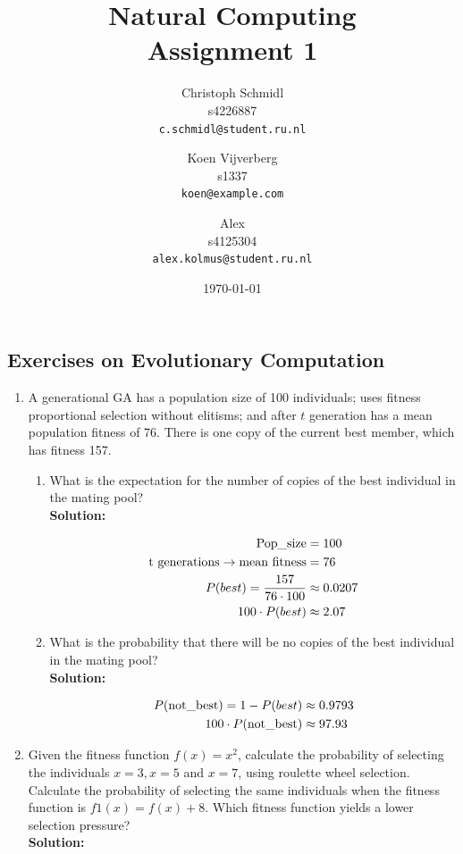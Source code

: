 \documentclass[a4paper]{article}
\title{Natural Computing\\Assignment 1}
\author{
  Christoph Schmidl\\ s4226887\\      \texttt{c.schmidl@student.ru.nl}
  \and
  Koen Vijverberg\\ s1337\\     \texttt{koen@example.com}
  \and
  Alex\\	s4125304\\	\texttt{alex.kolmus@student.ru.nl}
}
\date{\today}
\begin{document}
\maketitle


\subsection*{Exercises on Evolutionary Computation}

\begin{enumerate}

	\item A generational GA has a population size of 100 individuals; uses fitness proportional
selection without elitisms; and after $t$ generation has a mean population fitness of 76.
There is one copy of the current best member, which has fitness 157.

	\begin{enumerate}
		\item What is the expectation for the number of copies of the best individual in the mating pool?\\
		\textbf{Solution:}
		
\begin{align*}
	\text{Pop\_size} &= 100\notag\\
	\text{t generations} \rightarrow \text{mean fitness} &= 76\notag\\
	P(best) = \frac{157}{76 \cdot 100} &\approx 0.0207\notag\\
	100 \cdot P(best) &\approx 2.07\notag
\end{align*}	
		
		
		\item What is the probability that there will be no copies of the best individual in the mating pool?\\
		\textbf{Solution:}
		
\begin{align*}
 P(\text{not\_best}) = 1 - P(best) &\approx 0.9793\notag\\
 100 \cdot P(\text{not\_best}) &\approx 97.93
\end{align*}		
		
	

	
	
	\end{enumerate}

	\item Given the fitness function $f(x) = x^2$, calculate the probability of selecting the individuals $x = 3, x = 5$ and $x = 7$, using roulette wheel selection. Calculate the probability of selecting the same individuals when the fitness function is $f1(x) = f(x) + 8$. Which fitness function yields a lower selection pressure?\\
	\textbf{Solution:}\\	



\end{enumerate}
\end{document}
